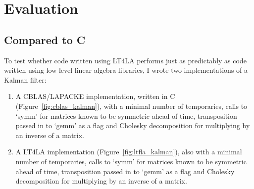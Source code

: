 \chapter{Evaluation}\label{chap:eval}



%

\section{Compared to C}

To test whether code written using LT4LA performs just as predictably as code
written using low-level linear-algebra libraries, I wrote two implementations
of a Kalman filter:

\begin{enumerate}

    \item A CBLAS/LAPACKE implementation, written in C
        (Figure~\ref{fig:cblas_kalman}), with a minimal number of temporaries,
        calls to `symm' for matrices known to be symmetric ahead of time,
        transposition passed in to `gemm' as a flag and Cholesky decomposition
        for multiplying by an inverse of a matrix.

    \item A LT4LA implementation (Figure~\ref{fig:ltfla_kalman}), also with a
        minimal number of temporaries, calls to `symm' for matrices known to be
        symmetric ahead of time, transposition passed in to `gemm' as a flag
        and Cholesky decomposition for multiplying by an inverse of a matrix.

\end{enumerate}

